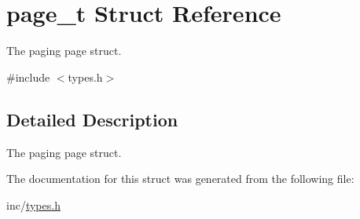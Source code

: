 \hypertarget{structpage__t}{
\section{page\_\-t Struct Reference}
\label{structpage__t}
}


The paging page struct.  




{\ttfamily \#include $<$types.h$>$}



\subsection{Detailed Description}
The paging page struct. 

The documentation for this struct was generated from the following file:\begin{DoxyCompactItemize}
\item 
inc/\hyperlink{types_8h}{types.h}\end{DoxyCompactItemize}
